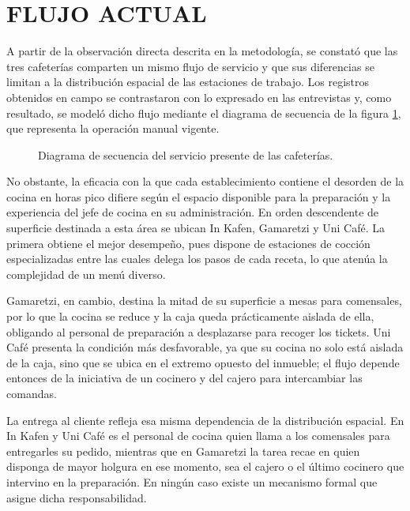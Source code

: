 \section{FLUJO ACTUAL}
A partir de la observación directa descrita en la metodología, se constató que las tres cafeterías comparten un mismo flujo de servicio y que sus diferencias se limitan a la distribución espacial de las estaciones de trabajo. Los registros obtenidos en campo se contrastaron con lo expresado en las entrevistas y, como resultado, se modeló dicho flujo mediante el diagrama de secuencia de la figura \ref{fig:diagrama-secuencia-flujo-presente}, que representa la operación manual vigente.

\begin{figure}[H]
    \centering
    
    \caption{Diagrama de secuencia del servicio presente de las cafeterías.}
    \label{fig:diagrama-secuencia-flujo-presente}
\end{figure}

No obstante, la eficacia con la que cada establecimiento contiene el desorden de la cocina en horas pico difiere según el espacio disponible para la preparación y la experiencia del jefe de cocina en su administración. En orden descendente de superficie destinada a esta área se ubican In Kafen, Gamaretzi y Uni Café. La primera obtiene el mejor desempeño, pues dispone de estaciones de cocción especializadas entre las cuales delega los pasos de cada receta, lo que atenúa la complejidad de un menú diverso.

Gamaretzi, en cambio, destina la mitad de su superficie a mesas para comensales, por lo que la cocina se reduce y la caja queda prácticamente aislada de ella, obligando al personal de preparación a desplazarse para recoger los tickets. Uni Café presenta la condición más desfavorable, ya que su cocina no solo está aislada de la caja, sino que se ubica en el extremo opuesto del inmueble; el flujo depende entonces de la iniciativa de un cocinero y del cajero para intercambiar las comandas.

La entrega al cliente refleja esa misma dependencia de la distribución espacial. En In Kafen y Uni Café es el personal de cocina quien llama a los comensales para entregarles su pedido, mientras que en Gamaretzi la tarea recae en quien disponga de mayor holgura en ese momento, sea el cajero o el último cocinero que intervino en la preparación. En ningún caso existe un mecanismo formal que asigne dicha responsabilidad.


